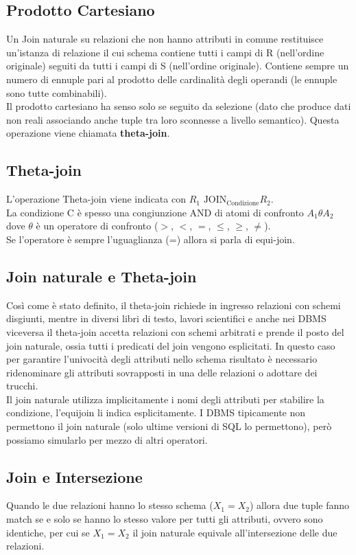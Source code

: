 \subsection*{Prodotto Cartesiano}
Un Join naturale su relazioni che non hanno attributi in comune restituisce un'istanza di 
relazione il cui schema contiene tutti i campi di R (nell'ordine originale) seguiti da tutti
i campi di S (nell'ordine originale). Contiene sempre un numero di ennuple pari al prodotto delle
cardinalità degli operandi (le ennuple sono tutte combinabili).\\
Il prodotto cartesiano ha senso solo se seguito da selezione (dato che produce dati non reali associando
anche tuple tra loro sconnesse a livello semantico). Questa operazione viene chiamata \textbf{theta-join}.
\subsection*{Theta-join}
L'operazione Theta-join viene indicata con $R_1 \,\, \text{JOIN}_{\text{Condizione}}R_2$.\\
La condizione C è spesso una congiunzione AND di atomi di confronto $A_1 \theta A_2$ dove $\theta$ è un
operatore di confronto ($>$, $<$, $=$, $\leq$, $\geq$, $\neq$).\\
Se l'operatore è sempre l'uguaglianza (=) allora si parla di equi-join.\\
\subsection*{Join naturale e Theta-join}
Così come è stato definito, il theta-join richiede in ingresso relazioni con schemi disgiunti,
mentre in diversi libri di testo, lavori scientifici e anche nei DBMS viceversa il theta-join 
accetta relazioni con schemi arbitrati e prende il posto del join naturale, ossia tutti i predicati
del join vengono esplicitati. In questo caso per garantire l'univocità degli attributi nello schema
risultato è necessario ridenominare gli attributi sovrapposti in una delle relazioni o adottare
dei trucchi.\\
Il join naturale utilizza implicitamente i nomi degli attributi per stabilire la condizione,
l'equijoin li indica esplicitamente. I DBMS tipicamente non permettono il join naturale
(solo ultime versioni di SQL lo permettono), però possiamo simularlo per mezzo di altri operatori.
\subsection*{Join e Intersezione}
Quando le due relazioni hanno lo stesso schema ($X_1 = X_2$) allora due tuple fanno match
se e solo se hanno lo stesso valore per tutti gli attributi, ovvero sono identiche, per cui
se $X_1 = X_2$ il join naturale equivale all'intersezione delle due relazioni.
